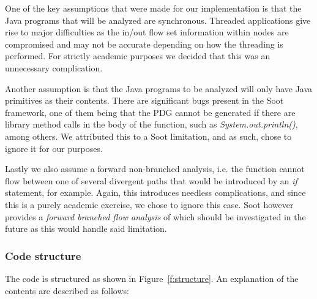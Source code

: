 \documentclass[authoryear,preprint]{sigplanconf}
\begin{document}
One of the key assumptions that were made for our implementation is that the Java programs that will be analyzed are synchronous. Threaded applications give rise to major difficulties as the in/out flow set information within nodes are compromised and may not be accurate depending on how the threading is performed. For strictly academic purposes we decided that this was an unnecessary complication.

Another assumption is that the Java programs to be analyzed will only have Java primitives as their contents. There are significant bugs present in the Soot framework, one of them being that the PDG cannot be generated if there are library method calls in the body of the function, such as \textit{System.out.println()}, among others. We attributed this to a Soot limitation, and as such, chose to ignore it for our purposes.

Lastly we also assume a forward non-branched analysis, i.e. the function cannot flow between one of several divergent paths that would be introduced by an \textit{if} statement, for example. Again, this introduces needless complications, and since this is a purely academic exercise, we chose to ignore this case. Soot however provides a \textit{forward branched flow analysis} of which should be investigated in the future as this would handle said limitation.

\subsubsection{Code structure}

The code is structured as shown in Figure~\ref{f:structure}. An explanation of the contents are described as follows:
\end{document}

